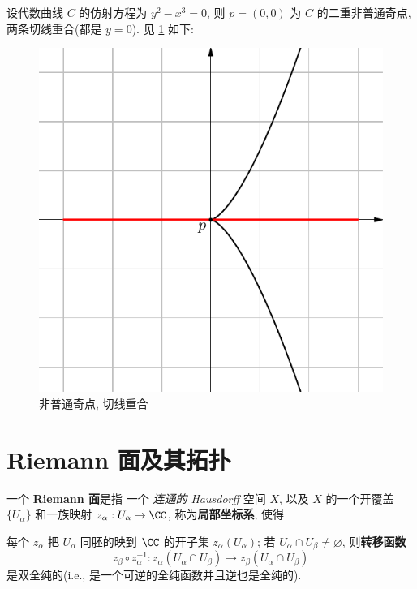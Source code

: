 \begin{exmp}[非普通奇点]
\label{exmp:non-ordinary}
设代数曲线 $C$ 的仿射方程为 $y^2 - x^3 = 0$,
则 $p = (0,0)$ 为 $C$ 的二重非普通奇点,
两条切线重合(都是 $y = 0$).
见 \cref{fig:non-ordinary} 如下:
\begin{figure}[H]
    \centering
    \includegraphics[scale=0.65]{fig-02.pdf}
    \caption{非普通奇点, 切线重合}
    \label{fig:non-ordinary}
\end{figure}
\end{exmp}

\section{Riemann 面及其拓扑}

\begin{defin}[Riemann 面]
\label{defin:2.4}
一个 \textbf{Riemann 面}是指 一个 \textit{连通的 Hausdorff} 空间 $X$,
以及 $X$ 的一个开覆盖 $\{U_\alpha\}$
和一族映射 $z_\alpha: U_\alpha \to \CC$, 称为\textbf{局部坐标系}, 使得
\begin{enumerate}[label=(\arabic*)]
    \ii 每个 $z_\alpha$ 把 $U_\alpha$ 同胚的映到 $\CC$ 的开子集 $z_\alpha(U_\alpha)$;
    \ii 若 $U_\alpha \cap U_\beta \ne \varnothing$, 则\textbf{转移函数}
    \[z_\beta\circ z_\alpha^{-1}: z_\alpha(U_\alpha\cap U_\beta) \to z_\beta(U_\alpha\cap U_\beta)\]
    是双全纯的(i.e., 是一个可逆的全纯函数并且逆也是全纯的).
\end{enumerate}
\end{defin}

